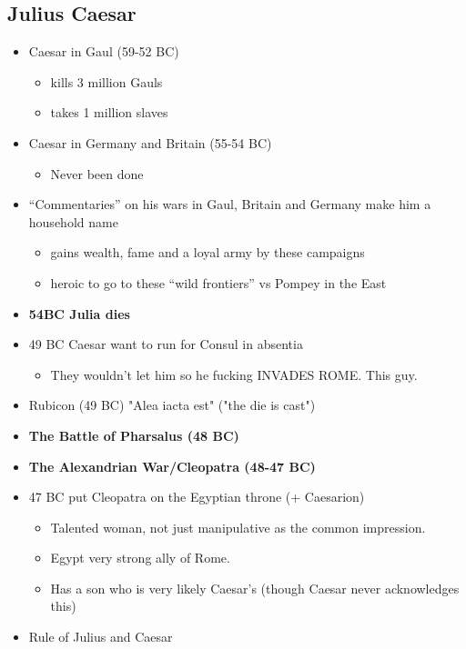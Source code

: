 \documentclass[12pt, twoside]{article}
\begin{document}
\subsection{Julius Caesar}
\begin{itemize}
\item Caesar in Gaul (59-52 BC)
	\begin{itemize}
	\item kills 3 million Gauls
	\item takes 1 million slaves
	\end{itemize}
\item Caesar in Germany and Britain (55-54 BC) 
	\begin{itemize}
	\item Never been done
	\end{itemize}
\item “Commentaries” on his wars in Gaul, Britain and Germany make him a household name
	\begin{itemize}
	\item gains wealth, fame and a loyal army by these campaigns
	\item heroic to go to these “wild frontiers” vs Pompey in the East
	\end{itemize}
\item \textbf{54BC Julia dies}
\item 49 BC Caesar want to run for Consul in absentia 
	\begin{itemize}
	\item They wouldn't let him so he fucking INVADES ROME.  This guy.
	\end{itemize}
\item Rubicon (49 BC) "Alea iacta est" ("the die is cast")
\item \textbf{The Battle of Pharsalus (48 BC)}
\item \textbf{The Alexandrian War/Cleopatra (48-47 BC)}
\item 47 BC put Cleopatra on the Egyptian throne (+ Caesarion)
	\begin{itemize}
	\item Talented woman, not just manipulative as the common impression.
	\item Egypt very strong ally of Rome.
	\item Has a son who is very likely Caesar's (though Caesar never acknowledges this)
	\end{itemize}
\item Rule of Julius and Caesar
\end{itemize}
		
\end{document}
